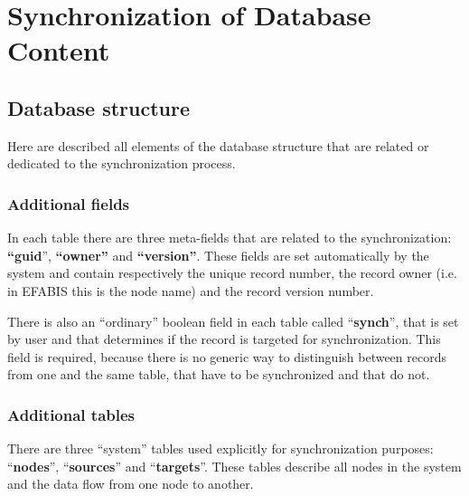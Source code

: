 \chapter{Synchronization of Database Content}
\section{Database structure}

Here are described all elements of the database structure that are
related or dedicated to the synchronization process.


\subsection{Additional fields}

In each table there are three meta-fields that are related to the
synchronization: \textbf{{}``guid}'', \textbf{{}``owner''} and
\textbf{{}``version''}. These fields are set automatically by the
system and contain respectively the unique record number, the record
owner (i.e. in EFABIS this is the node name) and the record version
number. 

There is also an {}``ordinary'' boolean field in each table called
{}``\textbf{synch}'', that is set by user and that determines if
the record is targeted for synchronization. This field is required,
because there is no generic way to distinguish between records from
one and the same table, that have to be synchronized and that do not.


\subsection{Additional tables}

There are three {}``system'' tables used explicitly for synchronization
purposes: {}``\textbf{nodes}'', {}``\textbf{sources}'' and {}``\textbf{targets}''.
These tables describe all nodes in the system and the data flow from
one node to another.

